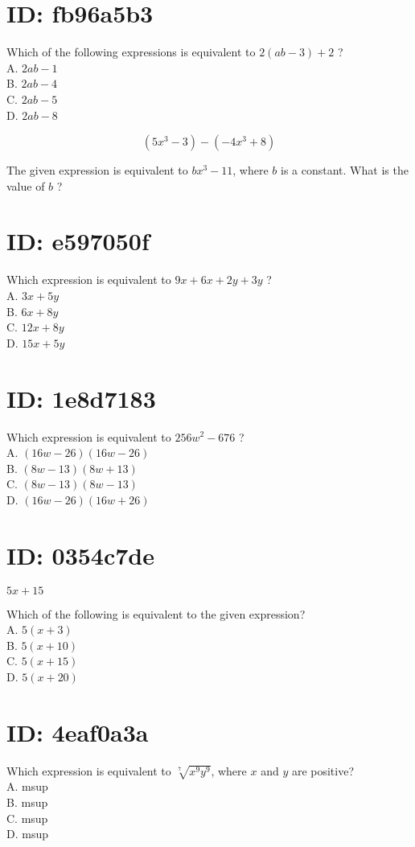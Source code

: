 \section*{ID: fb96a5b3}
Which of the following expressions is equivalent to $2(a b-3)+2$ ?\\
A. $2 a b-1$\\
B. $2 a b-4$\\
C. $2 a b-5$\\
D. $2 a b-8$

$$
\left(5 x^{3}-3\right)-\left(-4 x^{3}+8\right)
$$

The given expression is equivalent to $b x^{3}-11$, where $b$ is a constant. What is the value of $b$ ?

\section*{ID: e597050f}
Which expression is equivalent to $9 x+6 x+2 y+3 y$ ?\\
A. $3 x+5 y$\\
B. $6 x+8 y$\\
C. $12 x+8 y$\\
D. $15 x+5 y$

\section*{ID: 1e8d7183}
Which expression is equivalent to $256 w^{2}-676$ ?\\
A. $(16 w-26)(16 w-26)$\\
B. $(8 w-13)(8 w+13)$\\
C. $(8 w-13)(8 w-13)$\\
D. $(16 w-26)(16 w+26)$

\section*{ID: 0354c7de}
$5 x+15$

Which of the following is equivalent to the given expression?\\
A. $5(x+3)$\\
B. $5(x+10)$\\
C. $5(x+15)$\\
D. $5(x+20)$

\section*{ID: 4eaf0a3a}
Which expression is equivalent to $\sqrt[7]{x^{9} y^{9}}$, where $x$ and $y$ are positive?\\
A. msup\\
B. msup\\
C. msup\\
D. msup

